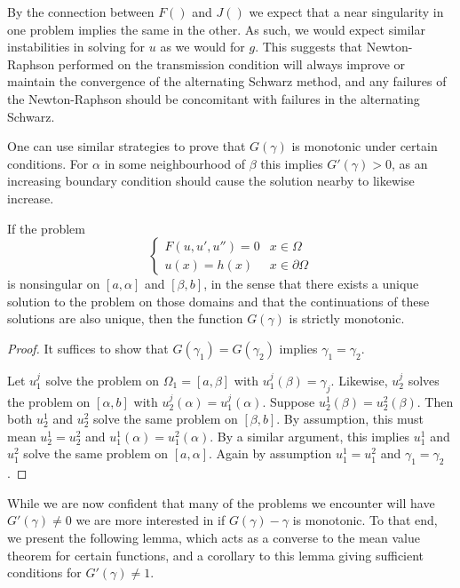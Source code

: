 \documentclass{book}
\begin{document}
By the connection between $F()$ and $J()$ we expect that a near singularity in one problem implies the same in the other.
As such, we would expect similar instabilities in solving for $u$ as we would for $g$.
This suggests that Newton-Raphson performed on the transmission condition will always improve or maintain the convergence of the alternating Schwarz method, and any failures of the Newton-Raphson should be concomitant with failures in the alternating Schwarz.

One can use similar strategies to prove that $G(\gamma)$ is monotonic under certain conditions.
For $\alpha$ in some neighbourhood of $\beta$ this implies $G'(\gamma)>0$, as an increasing boundary condition should cause the solution nearby to likewise increase.

\begin{thm}
If the problem
\begin{equation*}
\begin{cases} F(u,u',u'') = 0 & x \in \Omega \\ u(x) = h(x) & x \in \partial \Omega \end{cases}
\end{equation*}
is nonsingular on $[a,\alpha]$ and $[\beta,b]$, in the sense that there exists a unique solution to the problem on those domains and that the continuations of these solutions are also unique, then the function $G(\gamma)$ is strictly monotonic.
\end{thm}

\begin{proof}
It suffices to show that $G(\gamma_1) = G(\gamma_2)$ implies $\gamma_1 = \gamma_2$.

Let $u^j_1$ solve the problem on $\Omega_1 = [a,\beta]$ with $u^j_1(\beta) = \gamma_j$.
Likewise, $u^j_2$ solves the problem on $[\alpha, b]$ with $u^j_2(\alpha) = u^j_1(\alpha)$.
Suppose $u^1_2(\beta) = u^2_2(\beta)$.
Then both $u^1_2$ and $u^2_2$ solve the same problem on $[\beta,b]$.
By assumption, this must mean $u^1_2 = u^2_2$ and $u^1_1(\alpha) = u^2_1(\alpha)$.
By a similar argument, this implies $u^1_1$ and $u^2_1$ solve the same problem on $[a,\alpha]$.
Again by assumption $u^1_1 = u^2_1$ and $\gamma_1 = \gamma_2$.
\end{proof}

While we are now confident that many of the problems we encounter will have $G'(\gamma) \neq 0$ we are more interested in if $G(\gamma) - \gamma$ is monotonic.
To that end, we present the following lemma, which acts as a converse to the mean value theorem for certain functions, and a corollary to this lemma giving sufficient conditions for $G'(\gamma) \neq 1$.
\end{document}
